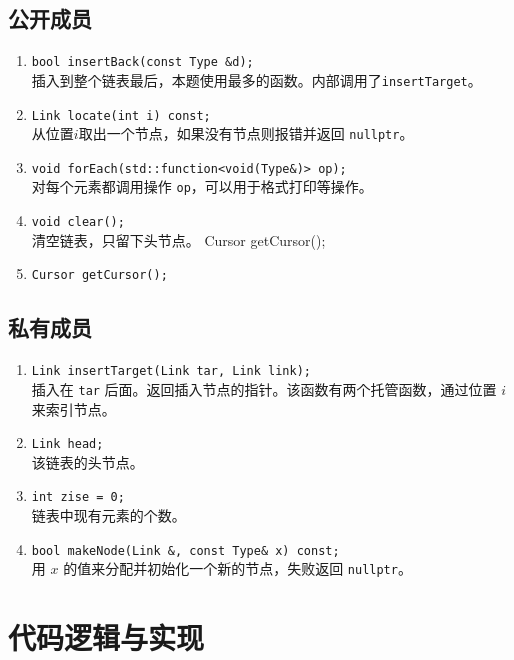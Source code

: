 {
\subsection{公开成员}
\begin{enumerate}
    \item \lstinline{bool insertBack(const Type &d);}\\
          插入到整个链表最后，本题使用最多的函数。内部调用了\lstinline{insertTarget}。
    \item \lstinline{Link locate(int i) const;} \\
          从位置$i$取出一个节点，如果没有节点则报错并返回 \lstinline{nullptr}。
    \item \lstinline{void forEach(std::function<void(Type&)> op);} \\
          对每个元素都调用操作 \lstinline{op}，可以用于格式打印等操作。
    \item \lstinline{void clear();} \\
          清空链表，只留下头节点。
          Cursor getCursor();
    \item \lstinline{Cursor getCursor();} \\
\end{enumerate}

\subsection{私有成员}
\begin{enumerate}
    \item \lstinline{Link insertTarget(Link tar, Link link);}\\
          插入在 \lstinline{tar} 后面。返回插入节点的指针。该函数有两个托管函数，通过位置 $i$ 来索引节点。
    \item \lstinline{Link head;} \\
          该链表的头节点。
    \item \lstinline{int zise = 0;} \\
          链表中现有元素的个数。
    \item \lstinline{bool makeNode(Link &, const Type& x) const;} \\
          用 $x$ 的值来分配并初始化一个新的节点，失败返回 \lstinline{nullptr}。
\end{enumerate}
}

\section{代码逻辑与实现}

